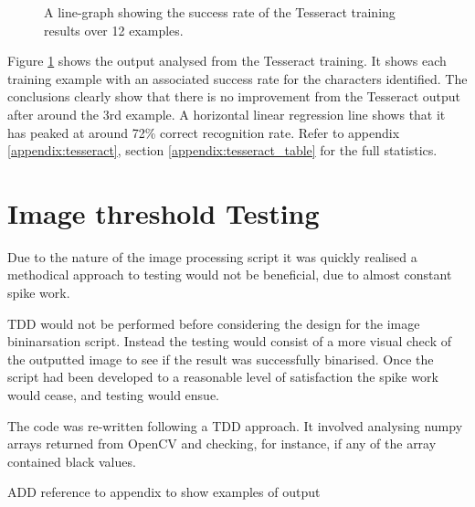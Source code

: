 \begin{figure}[h!]
  \centering
{}
\caption{A line-graph showing the success rate of the Tesseract training results over 12 examples.}
\label{fig:tesseract_graph}
\end{figure}

Figure \ref{fig:tesseract_graph} shows the output analysed from the Tesseract training. It shows each training example with an associated success rate for the characters identified. The conclusions clearly show that there is no improvement from the Tesseract output after around the 3rd example. A horizontal linear regression line shows that it has peaked at around 72\% correct recognition rate. Refer to appendix \ref{appendix:tesseract}, section \ref{appendix:tesseract_table} for the full statistics.

\section{Image threshold Testing}
Due to the nature of the image processing script it was quickly realised a methodical approach to testing would not be beneficial, due to almost constant spike work.

TDD would not be performed before considering the design for the image bininarsation script. Instead the testing would consist of a more visual check of the outputted image to see if the result was successfully binarised. Once the script had been developed to a reasonable level of satisfaction the spike work would cease, and testing would ensue.

The code was re-written following a TDD approach. It involved analysing numpy arrays returned from OpenCV and checking, for instance, if any of the array contained black values.

ADD reference to appendix to show examples of output
